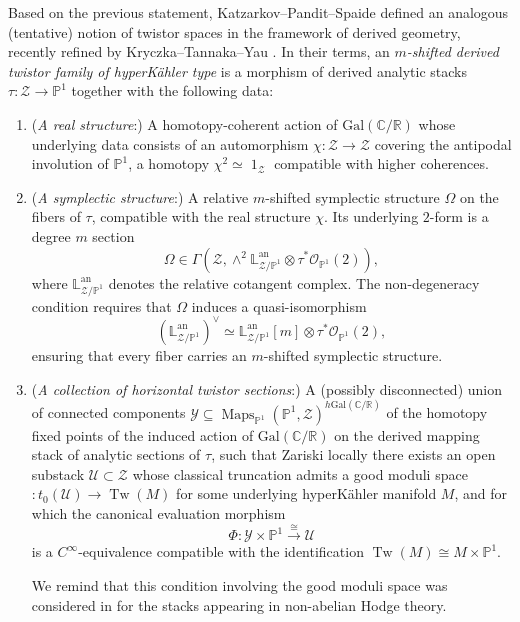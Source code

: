 \documentclass[11pt, a4paper]{amsart}
\numberwithin{equation}{section}
\theoremstyle{definition}
\theoremstyle{remark}
\DeclareMathOperator{\id}{1}
\DeclareMathOperator{\Maps}{Maps}
\DeclareMathOperator{\an}{an}
\DeclareMathOperator{\Tw}{Tw}
\newcommand{\Oo}{\mathcal{O}}
\newcommand{\Uu}{\mathcal{U}}
\newcommand{\Yy}{\mathcal{Y}}
\newcommand{\Zz}{\mathcal{Z}}
\newcommand{\CC}{\mathbb{C}}
\newcommand{\RR}{\mathbb{R}}
\newcommand{\LL}{\mathbb{L}}
\newcommand{\PP}{\mathbb{P}}
\renewcommand{\to}{\longrightarrow}
\begin{document}
Based on the previous statement, Katzarkov--Pandit--Spaide \cite{KPS} defined an analogous (tentative) notion of twistor spaces in the framework of derived geometry, recently refined by Kryczka--Tannaka--Yau \cite{kryczka&tannaka&yau}. In their terms, an {\it $m$-shifted derived twistor family of hyperKähler type} is a morphism of derived analytic stacks $\tau : \Zz \to \PP^1$ together with the following data:
\begin{enumerate}

\item ({\it A real structure}:) A homotopy-coherent action of $\mathrm{Gal}(\CC/\RR)$ whose underlying data consists of an automorphism $\chi:\Zz \to \Zz$ covering the antipodal involution of $\PP^1$, a homotopy $\chi^2 \simeq \id_{\Zz}$ compatible with higher coherences.

\item ({\it A symplectic structure}:) A relative $m$-shifted symplectic structure $\Omega$ on the fibers of $\tau$, compatible with the real structure $\chi$. Its underlying $2$-form is a degree $m$ section
\[
\Omega \in \Gamma\!\left( \Zz, \wedge^2 \LL^{\an}_{\Zz/\PP^1} \otimes\tau^*\Oo_{\PP^1}(2) \right),
\]
where $\LL^{\an}_{\Zz/\PP^1}$ denotes the relative cotangent complex. The non-degeneracy condition requires that $\Omega$ induces a quasi-isomorphism
\[
(\LL^{\an}_{\Zz/\PP^1})^\vee
\simeq
\LL^{\an}_{\Zz/\PP^1}[m] \otimes \tau^*\Oo_{\PP^1}(2),
\]
ensuring that every fiber carries an $m$-shifted symplectic structure.

\item ({\it A collection of horizontal twistor sections}:) A (possibly disconnected) union of connected components $\Yy \subseteq \Maps_{\mathbb{P}^1}\left (\PP^1,\Zz \right )^{h \mathrm{Gal}(\CC/\RR)}$ of the homotopy fixed points of the induced action of $\mathrm{Gal}(\CC/\RR)$ on the derived mapping stack of analytic sections of $\tau$, such that Zariski locally there exists an open substack $\Uu \subset \Zz$ whose classical truncation admits a good moduli space $:t_0(\Uu) \longrightarrow \Tw(M)$ for some underlying hyperKähler manifold $M$, and for which the canonical evaluation morphism
\begin{equation} \label{eq derived stack trivialization of twistor}
\Phi:\Yy \times \PP^1 \xrightarrow{\cong} \Uu
\end{equation}
is a $C^\infty$-equivalence compatible with the identification $\Tw(M)\cong M\times\PP^1$. 


We remind that this condition involving the good moduli space was considered in \cite{franco&hanson, hanson_1} for the stacks appearing in non-abelian Hodge theory. 
\end{enumerate}
\end{document}
